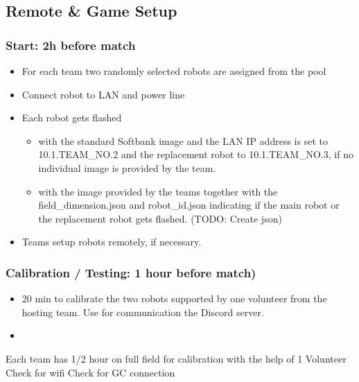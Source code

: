 \subsection{Remote \& Game Setup}

\subsubsection{Start: 2h before match}

    \begin{itemize}
        \item For each team two randomly selected robots are assigned from the pool
        \item Connect robot to LAN and power line
        \item Each robot gets flashed 
        \begin{itemize}
            \item with the standard Softbank image and the LAN IP address is set to 10.1.TEAM\_NO.2 and the replacement robot to 10.1.TEAM\_NO.3, if no individual image is provided by the team.
            \item with the image provided by the teams together with the field\_dimension.json and robot\_id.json indicating if the main robot or the replacement robot gets flashed. (TODO: Create json) 
        \end{itemize}
        \item Teams setup robots remotely, if necessary.
    \end{itemize}

\subsubsection{Calibration / Testing: 1 hour before match)}

    \begin{itemize}
        \item 20 min to calibrate the two robots supported by one volunteer from the hosting team. Use for communication the Discord server.
        \item  
    \end{itemize}

    Each team has 1/2 hour on full field for calibration with the help of 1 Volunteer
    Check for wifi
    Check for GC connection

